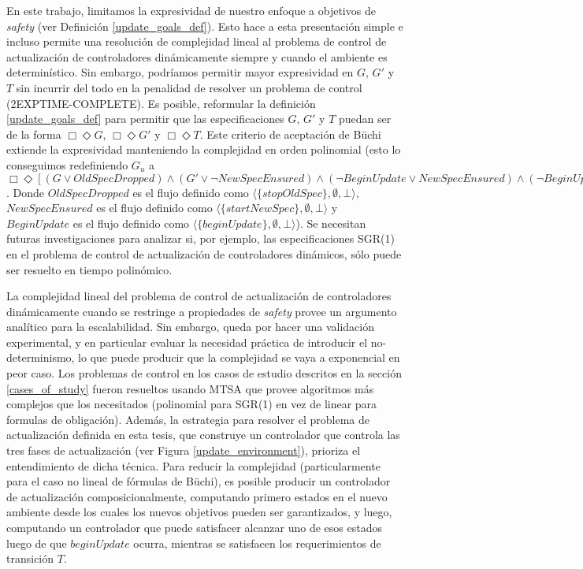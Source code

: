 En este trabajo, limitamos la expresividad de nuestro enfoque a objetivos de \emph{safety} (ver Definición
\ref{update_goals_def}). Esto hace a esta presentación simple e incluso permite una resolución de complejidad lineal al
problema de control de actualización de controladores dinámicamente siempre y cuando el ambiente es determinístico. Sin
embargo, podríamos permitir mayor expresividad en $G$, $G'$ y $T$ sin incurrir del todo en la penalidad de resolver un
problema de control (2EXPTIME-COMPLETE). Es posible, reformular la definición \ref{update_goals_def} para permitir que
las especificaciones $G$, $G'$ y $T$ puedan ser de la forma $\Box \Diamond G$, $\Box \Diamond G'$ y $\Box \Diamond T$.
Este criterio de aceptación de Büchi extiende la expresividad manteniendo la complejidad en orden polinomial (esto lo
conseguimos redefiniendo $G_u$ a $\Box \Diamond [(G \lor OldSpecDropped) \wedge (G' \lor \neg NewSpecEnsured) \wedge
(\neg BeginUpdate \lor NewSpecEnsured) \wedge (\neg BeginUpdate \lor  OldSpecDropped) \wedge  T]$. Donde
$OldSpecDropped$ es el flujo definido como $\langle \{stopOldSpec\},\emptyset,\bot\rangle$, $NewSpecEnsured$ es el flujo
definido como $\langle \{startNewSpec\},\emptyset,\bot\rangle$ y $BeginUpdate$ es el flujo definido como $\langle
\{beginUpdate\},\emptyset,\bot\rangle$). Se necesitan futuras investigaciones para analizar si, por ejemplo, las
especificaciones SGR(1) \cite{D'ippolito:2013:SNE:2430536.2430543} en el problema de control de actualización de
controladores dinámicos, sólo puede ser resuelto en tiempo polinómico.

La complejidad lineal del problema de control de actualización de controladores dinámicamente cuando se restringe a
propiedades de \emph{safety} provee un argumento analítico para la escalabilidad. Sin embargo, queda por hacer una
validación experimental, y en particular evaluar la necesidad práctica de introducir el no-determinismo, lo que puede
producir que la complejidad se vaya a exponencial en peor caso. Los problemas de control en los casos de estudio
descritos en la sección \ref{cases_of_study} fueron resueltos usando MTSA que provee algoritmos más complejos que los
necesitados (polinomial para SGR(1) en vez de linear para formulas de obligación). Además, la estrategia para resolver
el problema de actualización definida en esta tesis, que construye un controlador que controla las tres fases de
actualización (ver Figura \ref{update_environment}), prioriza el entendimiento de dicha técnica. Para reducir la
complejidad (particularmente para el caso no lineal de fórmulas de Büchi), es posible producir un controlador de
actualización composicionalmente, computando primero estados en el nuevo ambiente desde los cuales los nuevos objetivos
pueden ser garantizados, y luego, computando un controlador que puede satisfacer alcanzar uno de esos estados luego de
que $beginUpdate$ ocurra, mientras se satisfacen los requerimientos de transición $T$.

